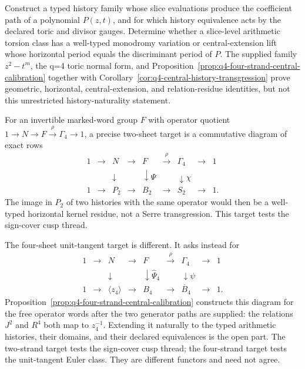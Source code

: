 \begin{problem}
\label{prob:mixed-slice-tube-naturality}
Construct a typed history family whose slice evaluations produce the coefficient
path of a polynomial $P(z,t)$, and for which history equivalence acts by the
declared toric and divisor gauges.  Determine whether a slice-level arithmetic
torsion class has a well-typed monodromy variation or central-extension lift whose
horizontal period equals the discriminant period of $P$.  The supplied family
$z^2-t^m$, the q=4 toric normal form, and
Proposition~\ref{prop:q4-four-strand-central-calibration} together with
Corollary~\ref{cor:q4-central-history-transgression} prove geometric,
horizontal, central-extension, and relation-residue identities, but not this
unrestricted history-naturality statement.

For an invertible marked-word group $F$ with operator quotient
$1\to N\to F\xrightarrow{\rho}\Gamma_4\to1$, a precise two-sheet target is a
commutative diagram of exact rows
\begin{equation}
\begin{array}{ccccccccc}
1&\longrightarrow&N&\longrightarrow&F&\xrightarrow{\rho}&\Gamma_4&\longrightarrow&1\\
 &&\downarrow&&\downarrow\widehat\Psi&&\downarrow\chi&&\\
1&\longrightarrow&P_2&\longrightarrow&B_2&\longrightarrow&S_2&\longrightarrow&1.
\end{array}
\label{eq:history-to-pure-braid-target}
\end{equation}
The image in $P_2$ of two histories with the same operator would then be a
well-typed horizontal kernel residue, not a Serre transgression.  This target
tests the sign-cover cusp thread.

The four-sheet unit-tangent target is different.  It asks instead for
\begin{equation}
\begin{array}{ccccccccc}
1&\longrightarrow&N&\longrightarrow&F&\xrightarrow{\rho}&\Gamma_4&\longrightarrow&1\\
 &&\downarrow&&\downarrow\widehat\Psi_4&&\downarrow\psi&&\\
1&\longrightarrow&\langle z_4\rangle&\longrightarrow&B_4&\longrightarrow&
\overline B_4&\longrightarrow&1.
\end{array}
\label{eq:history-to-four-braid-target}
\end{equation}
Proposition~\ref{prop:q4-four-strand-central-calibration} constructs this diagram
for the free operator words after the two generator paths are supplied: the
relations $J^2$ and $R^4$ both map to $z_4^{-1}$.  Extending it naturally to the
typed arithmetic histories, their domains, and their declared equivalences is
the open part.  The two-strand target tests the sign-cover cusp thread; the
four-strand target tests the unit-tangent Euler class.  They are different
functors and need not agree.
\end{problem}

